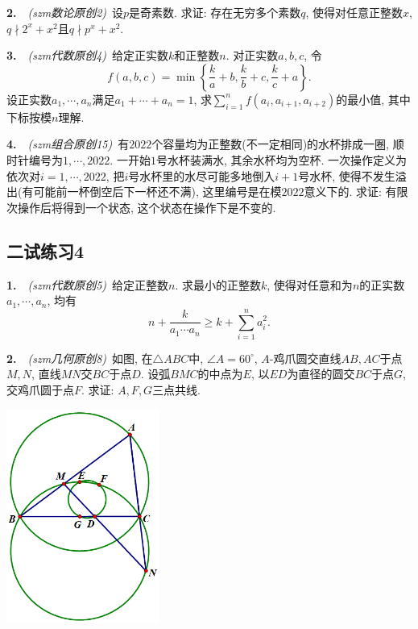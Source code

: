 \vspace{7em}

\textbf{2.}~~\textit{(szm数论原创2)}~设$p$是奇素数. 求证: 存在无穷多个素数$q$, 使得对任意正整数$x$, $q \nmid 2^x+x^2$且$q \nmid p^x+x^2$. 

\newpage

\textbf{3.}~~\textit{(szm代数原创4)}~给定正实数$k$和正整数$n$. 对正实数$a,b,c$, 令$$f(a,b,c) = \min \left\{ \frac{k}{a}+b,\frac{k}{b}+c,\frac{k}{c}+a \right\}.$$
设正实数$a_1,\cdots ,a_n$满足$a_1+\cdots +a_n=1$, 求$\sum_{i=1}^{n}f(a_i,a_{i+1},a_{i+2})$的最小值, 其中下标按模$n$理解. 

\vspace{24em}

\textbf{4.}~~\textit{(szm组合原创15)}~有$2022$个容量均为正整数(不一定相同)的水杯排成一圈, 顺时针编号为$1,\cdots ,2022$. 一开始$1$号水杯装满水, 其余水杯均为空杯. 一次操作定义为依次对$i=1,\cdots ,2022$, 把$i$号水杯里的水尽可能多地倒入$i+1$号水杯, 使得不发生溢出(有可能前一杯倒空后下一杯还不满), 这里编号是在模$2022$意义下的. 求证: 有限次操作后将得到一个状态, 这个状态在操作下是不变的. 


\newpage
\subsection*{二试练习4}

\textbf{1.}~~\textit{(szm代数原创5)}~给定正整数$n$. 求最小的正整数$k$, 使得对任意和为$n$的正实数$a_1,\cdots ,a_n$, 均有$$n+\frac{k}{a_1 \cdots a_n} \geq k + \sum_{i=1}^{n} a_i^2.$$

\vspace{22em}

\textbf{2.}~~\textit{(szm几何原创8)}~如图, 在$\triangle ABC$中, $\angle A=60^{\circ}$, $A$-鸡爪圆交直线$AB,AC$于点$M,N$, 直线$MN$交$BC$于点$D$. 设弧$BMC$的中点为$E$, 以$ED$为直径的圆交$BC$于点$G$, 交鸡爪圆于点$F$. 求证: $A,F,G$三点共线. 

\vspace{2em}
\includegraphics[width=5cm]{attachment/g8.png}


